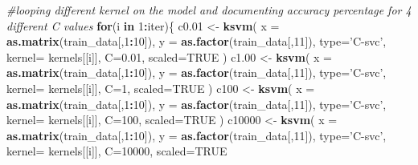 \documentclass[
]{article}
\newenvironment{Shaded}{\begin{snugshade}}{\end{snugshade}}
\newcommand{\CommentTok}[1]{\textcolor[rgb]{0.56,0.35,0.01}{\textit{#1}}}
\newcommand{\ControlFlowTok}[1]{\textcolor[rgb]{0.13,0.29,0.53}{\textbf{#1}}}
\newcommand{\DataTypeTok}[1]{\textcolor[rgb]{0.13,0.29,0.53}{#1}}
\newcommand{\DecValTok}[1]{\textcolor[rgb]{0.00,0.00,0.81}{#1}}
\newcommand{\FloatTok}[1]{\textcolor[rgb]{0.00,0.00,0.81}{#1}}
\newcommand{\KeywordTok}[1]{\textcolor[rgb]{0.13,0.29,0.53}{\textbf{#1}}}
\newcommand{\NormalTok}[1]{#1}
\newcommand{\OperatorTok}[1]{\textcolor[rgb]{0.81,0.36,0.00}{\textbf{#1}}}
\newcommand{\OtherTok}[1]{\textcolor[rgb]{0.56,0.35,0.01}{#1}}
\newcommand{\StringTok}[1]{\textcolor[rgb]{0.31,0.60,0.02}{#1}}
\begin{document}
\begin{Shaded}
\begin{Highlighting}[]
\CommentTok{#looping different kernel on the model and documenting accuracy percentage for 4 different C values}
\ControlFlowTok{for}\NormalTok{(i }\ControlFlowTok{in} \DecValTok{1}\OperatorTok{:}\NormalTok{iter)\{}
\NormalTok{    c0}\FloatTok{.01}\NormalTok{ <-}\StringTok{ }\KeywordTok{ksvm}\NormalTok{( }\DataTypeTok{x =} \KeywordTok{as.matrix}\NormalTok{(train_data[,}\DecValTok{1}\OperatorTok{:}\DecValTok{10}\NormalTok{]),}
                    \DataTypeTok{y =} \KeywordTok{as.factor}\NormalTok{(train_data[,}\DecValTok{11}\NormalTok{]),}
                    \DataTypeTok{type=}\StringTok{'C-svc'}\NormalTok{,}
                    \DataTypeTok{kernel=}\NormalTok{ kernels[[i]],}
                    \DataTypeTok{C=}\FloatTok{0.01}\NormalTok{, }
                    \DataTypeTok{scaled=}\OtherTok{TRUE}
\NormalTok{                    )}
\NormalTok{    c1}\FloatTok{.00}\NormalTok{ <-}\StringTok{ }\KeywordTok{ksvm}\NormalTok{( }\DataTypeTok{x =} \KeywordTok{as.matrix}\NormalTok{(train_data[,}\DecValTok{1}\OperatorTok{:}\DecValTok{10}\NormalTok{]),}
                    \DataTypeTok{y =} \KeywordTok{as.factor}\NormalTok{(train_data[,}\DecValTok{11}\NormalTok{]),}
                    \DataTypeTok{type=}\StringTok{'C-svc'}\NormalTok{,}
                    \DataTypeTok{kernel=}\NormalTok{ kernels[[i]],}
                    \DataTypeTok{C=}\DecValTok{1}\NormalTok{, }
                    \DataTypeTok{scaled=}\OtherTok{TRUE}
\NormalTok{                    )}
\NormalTok{    c100 <-}\StringTok{ }\KeywordTok{ksvm}\NormalTok{( }\DataTypeTok{x =} \KeywordTok{as.matrix}\NormalTok{(train_data[,}\DecValTok{1}\OperatorTok{:}\DecValTok{10}\NormalTok{]),}
                    \DataTypeTok{y =} \KeywordTok{as.factor}\NormalTok{(train_data[,}\DecValTok{11}\NormalTok{]),}
                    \DataTypeTok{type=}\StringTok{'C-svc'}\NormalTok{,}
                    \DataTypeTok{kernel=}\NormalTok{ kernels[[i]],}
                    \DataTypeTok{C=}\DecValTok{100}\NormalTok{, }
                    \DataTypeTok{scaled=}\OtherTok{TRUE}
\NormalTok{                    )}
\NormalTok{    c10000 <-}\StringTok{ }\KeywordTok{ksvm}\NormalTok{( }\DataTypeTok{x =} \KeywordTok{as.matrix}\NormalTok{(train_data[,}\DecValTok{1}\OperatorTok{:}\DecValTok{10}\NormalTok{]),}
                    \DataTypeTok{y =} \KeywordTok{as.factor}\NormalTok{(train_data[,}\DecValTok{11}\NormalTok{]),}
                    \DataTypeTok{type=}\StringTok{'C-svc'}\NormalTok{,}
                    \DataTypeTok{kernel=}\NormalTok{ kernels[[i]],}
                    \DataTypeTok{C=}\DecValTok{10000}\NormalTok{, }
                    \DataTypeTok{scaled=}\OtherTok{TRUE}

\end{Highlighting}
\end{Shaded}
\end{document}
